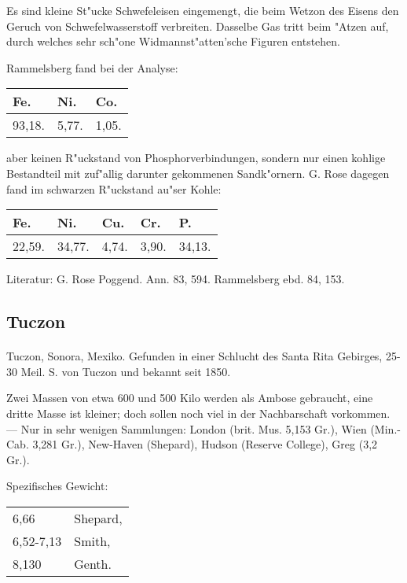\documentclass[a4paper, 11pt, oneside]{article}
\begin{document}
Es sind kleine St"ucke Schwefeleisen eingemengt, die beim Wetzon des Eisens den Geruch von Schwefelwasserstoff verbreiten. Dasselbe Gas tritt beim "Atzen auf, durch welches sehr sch"one Widmannst"atten'sche Figuren entstehen.

Rammelsberg fand bei der Analyse:
\begin{table}[H]
    \centering
    \begin{tabular}{l l l}
        Fe. & Ni. & Co. \\ \hline
        93,18. & 5,77. & 1,05. \\
    \end{tabular}
\end{table}

aber keinen R"uckstand von Phosphorverbindungen, sondern nur einen kohlige Bestandteil mit zuf"allig darunter gekommenen Sandk"ornern. G. Rose dagegen fand im schwarzen R"uckstand au"ser Kohle:
\begin{table}[H]
    \centering
    \begin{tabular}{l l l l l}
        Fe. & Ni. & Cu. & Cr. & P. \\ \hline
        22,59. & 34,77. & 4,74. & 3,90. & 34,13. \\
    \end{tabular}
\end{table}

\footnotesize
Literatur: G. Rose Poggend. Ann. 83, 594. Rammelsberg ebd. 84, 153.

\subsection{Tuczon}
\normalsize
\paragraph{}
Tuczon, Sonora, Mexiko. Gefunden in einer Schlucht des Santa Rita Gebirges, 25-30 Meil. S. von Tuczon und bekannt seit 1850.

Zwei Massen von etwa 600 und 500 Kilo werden als Ambose gebraucht, eine dritte Masse ist kleiner; doch sollen noch viel in der Nachbarschaft vorkommen. --- Nur in sehr wenigen Sammlungen: London (brit. Mus. 5,153 Gr.), Wien (Min.-Cab. 3,281 Gr.), New-Haven (Shepard), Hudson (Reserve College), Greg (3,2 Gr.).

Spezifisches Gewicht:  
\begin{table}[!ht]
    \centering
    \begin{tabular}{l l}
        6,66 & Shepard,\\
        6,52-7,13 & Smith,\\
        8,130 & Genth.
    \end{tabular}
\end{table}
\end{document}
